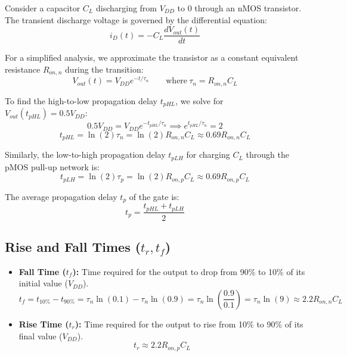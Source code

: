 \documentclass[12pt,a4paper]{article}
\begin{document}
Consider a capacitor $C_L$ discharging from $V_{DD}$ to 0 through an nMOS transistor. The transient discharge voltage is governed by the differential equation:
\begin{equation}
  i_D(t) = -C_L \frac{d V_{out}(t)}{d t}
\end{equation}

For a simplified analysis, we approximate the transistor as a constant equivalent resistance $R_{on,n}$ during the transition:
\begin{equation}
  V_{out}(t) = V_{DD} e^{-t / \tau_n} \qquad \text{where} \ \tau_n = R_{on,n} C_L
\end{equation}

To find the high-to-low propagation delay $t_{pHL}$, we solve for $V_{out}(t_{pHL}) = 0.5 V_{DD}$:
\begin{equation}
  0.5 V_{DD} = V_{DD} e^{-t_{pHL} / \tau_n} \implies e^{t_{pHL} / \tau_n} = 2
\end{equation}
\begin{equation}
  t_{pHL} = \ln(2) \tau_n = \ln(2) R_{on,n} C_L \approx 0.69 R_{on,n} C_L
\end{equation}

Similarly, the low-to-high propagation delay $t_{pLH}$ for charging $C_L$ through the pMOS pull-up network is:
\begin{equation}
  t_{pLH} = \ln(2) \tau_p = \ln(2) R_{on,p} C_L \approx 0.69 R_{on,p} C_L
\end{equation}

The average propagation delay $t_p$ of the gate is:
\begin{equation}
  t_p = \frac{t_{pHL} + t_{pLH}}{2}
\end{equation}

\subsection{Rise and Fall Times ($t_r, t_f$)}
\begin{itemize}[leftmargin=*, itemsep=3.5pt]
  \item \textbf{Fall Time ($t_f$):} Time required for the output to drop from 90\% to 10\% of its initial value ($V_{DD}$).
    \begin{equation}
      t_f = t_{10\%} - t_{90\%} = \tau_n \ln(0.1) - \tau_n \ln(0.9) = \tau_n \ln\left(\frac{0.9}{0.1}\right) = \tau_n \ln(9) \approx 2.2 R_{on,n} C_L
    \end{equation}
  \item \textbf{Rise Time ($t_r$):} Time required for the output to rise from 10\% to 90\% of its final value ($V_{DD}$).
    \begin{equation}
      t_r \approx 2.2 R_{on,p} C_L
    \end{equation}
\end{itemize}
\end{document}
